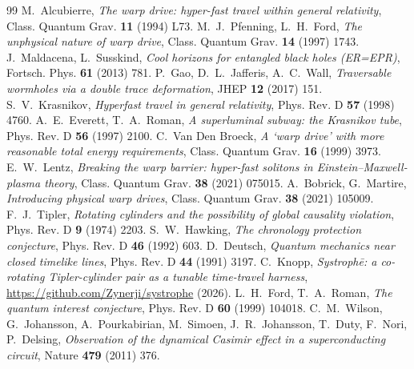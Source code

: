 \documentclass[11pt,a4paper]{article}
\begin{document}
\begin{thebibliography}{99}
M.~Alcubierre, \emph{The warp drive: hyper-fast travel within general relativity}, Class. Quantum Grav. \textbf{11} (1994) L73.
M.~J.~Pfenning, L.~H.~Ford, \emph{The unphysical nature of warp drive}, Class. Quantum Grav. \textbf{14} (1997) 1743.
J.~Maldacena, L.~Susskind, \emph{Cool horizons for entangled black holes (ER=EPR)}, Fortsch. Phys. \textbf{61} (2013) 781.
P.~Gao, D.~L.~Jafferis, A.~C.~Wall, \emph{Traversable wormholes via a double trace deformation}, JHEP \textbf{12} (2017) 151.
S.~V.~Krasnikov, \emph{Hyperfast travel in general relativity}, Phys. Rev. D \textbf{57} (1998) 4760.
A.~E.~Everett, T.~A.~Roman, \emph{A superluminal subway: the Krasnikov tube}, Phys. Rev. D \textbf{56} (1997) 2100.
C.~Van Den Broeck, \emph{A `warp drive' with more reasonable total energy requirements}, Class. Quantum Grav. \textbf{16} (1999) 3973.
E.~W.~Lentz, \emph{Breaking the warp barrier: hyper-fast solitons in Einstein--Maxwell-plasma theory}, Class. Quantum Grav. \textbf{38} (2021) 075015.
A.~Bobrick, G.~Martire, \emph{Introducing physical warp drives}, Class. Quantum Grav. \textbf{38} (2021) 105009.
F.~J.~Tipler, \emph{Rotating cylinders and the possibility of global causality violation}, Phys. Rev. D \textbf{9} (1974) 2203.
S.~W.~Hawking, \emph{The chronology protection conjecture}, Phys. Rev. D \textbf{46} (1992) 603.
D.~Deutsch, \emph{Quantum mechanics near closed timelike lines}, Phys. Rev. D \textbf{44} (1991) 3197.
C.~Knopp, \emph{Systroph\=e: a co-rotating Tipler-cylinder pair as a tunable time-travel harness}, \url{https://github.com/Zynerji/systrophe} (2026).
L.~H.~Ford, T.~A.~Roman, \emph{The quantum interest conjecture}, Phys. Rev. D \textbf{60} (1999) 104018.
C.~M.~Wilson, G.~Johansson, A.~Pourkabirian, M.~Simoen, J.~R.~Johansson, T.~Duty, F.~Nori, P.~Delsing, \emph{Observation of the dynamical Casimir effect in a superconducting circuit}, Nature \textbf{479} (2011) 376.
\end{thebibliography}
\end{document}
